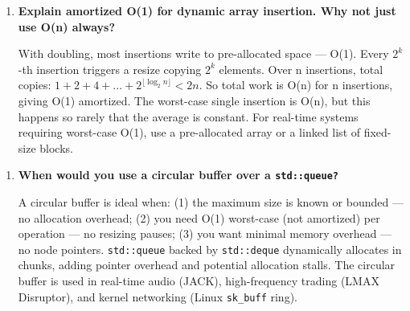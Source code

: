 \begin{enumerate}
\item \textbf{Explain amortized O(1) for dynamic array insertion. Why not just use O(n) always?}

With doubling, most insertions write to pre-allocated space — O(1). Every $2^k$-th insertion triggers a resize copying $2^k$ elements. Over n insertions, total copies: $1 + 2 + 4 + ... + 2^{\lfloor \log_2 n \rfloor} < 2n$. So total work is O(n) for n insertions, giving O(1) amortized. The worst-case single insertion is O(n), but this happens so rarely that the average is constant. For real-time systems requiring worst-case O(1), use a pre-allocated array or a linked list of fixed-size blocks.
\end{enumerate}

\begin{enumerate}
\item \textbf{When would you use a circular buffer over a \texttt{std::queue?}}

A circular buffer is ideal when: (1) the maximum size is known or bounded — no allocation overhead; (2) you need O(1) worst-case (not amortized) per operation — no resizing pauses; (3) you want minimal memory overhead — no node pointers. \texttt{std::queue} backed by \texttt{std::deque} dynamically allocates in chunks, adding pointer overhead and potential allocation stalls. The circular buffer is used in real-time audio (JACK), high-frequency trading (LMAX Disruptor), and kernel networking (Linux \texttt{sk\_buff} ring).
\end{enumerate}

